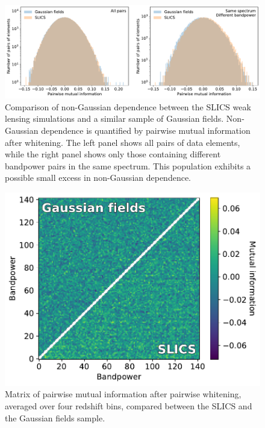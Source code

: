 \begin{figure}
\centering
\includegraphics[width=\textwidth]{slics_mi}
\caption{Comparison of non-Gaussian dependence between the SLICS weak lensing simulations and a similar sample of Gaussian fields. Non-Gaussian dependence is quantified by pairwise mutual information after whitening. The left panel shows all pairs of data elements, while the right panel shows only those containing different bandpower pairs in the same spectrum. This population exhibits a possible small excess in non-Gaussian dependence.}
\label{gl_Fig:slics_mi}
\end{figure}

\begin{figure}
\centering
\includegraphics[width=.5\textwidth]{slics_mi_matrix}
\caption{Matrix of pairwise mutual information after pairwise whitening, averaged over four redshift bins, compared between the SLICS and the Gaussian fields sample.}
\label{gl_Fig:slics_mi_matrix}
\end{figure}

